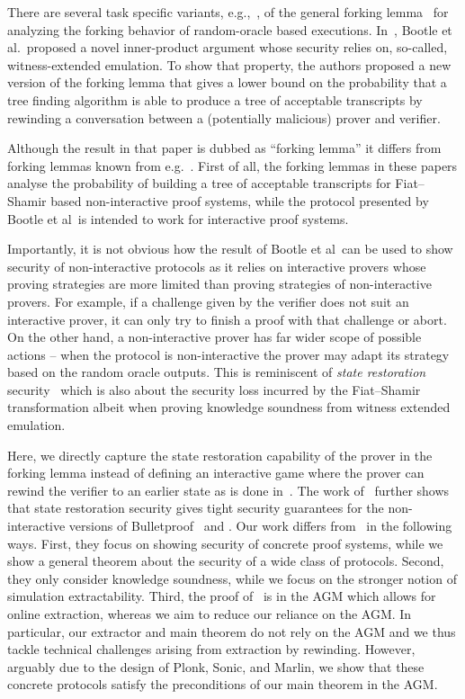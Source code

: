 There are several task specific variants, e.g.,~\cite{INDOCRYPT:HerSae03,CCS:BagCheJar08,AC:BelDaiLi19}, of the general forking lemma~\cite{JC:PoiSte00,CCS:BelNev06} for analyzing the forking behavior of random-oracle based executions.
In~\cite{EC:BCCGP16}, Bootle et al.~proposed a novel inner-product argument whose
security relies on, so-called, witness-extended emulation. To show that
property, the authors proposed a new version of the forking lemma that gives a
lower bound on the probability that a tree finding algorithm is able to produce a
tree of acceptable transcripts by rewinding a conversation between a
(potentially malicious) prover and verifier.

Although the result in that paper is dubbed as ``forking lemma'' it
differs from forking lemmas known from e.g.~\cite{JC:PoiSte00,CCS:BelNev06}.
First of all, the forking lemmas in these papers analyse the probability of building
a tree of acceptable transcripts for Fiat--Shamir based non-interactive proof
systems, while the protocol presented by Bootle et al~is intended to work for
interactive proof systems.

Importantly, it is not obvious how the result of Bootle et al~can be used to
show security of non-interactive protocols as it relies on interactive provers
whose proving strategies are more limited than proving strategies of
non-interactive provers. For example, if a challenge given by the verifier does not
suit an interactive prover, it can only try to finish a proof with that challenge or
abort. On the other hand, a non-interactive prover has far wider scope of
possible actions -- when the protocol is non-interactive the prover may
adapt its strategy based on the random oracle outputs. 
This is reminiscent of \emph{state restoration} security~\cite{TCC:BenChiSpo16,EPRINT:Holmgren19} which is also about the security loss incurred by the Fiat--Shamir transformation albeit when proving knowledge soundness from witness extended emulation.

Here, we directly capture the state restoration capability of the prover in the forking lemma instead of defining an interactive game where the prover can rewind the verifier to an earlier state as is done in~\cite{C:GhoTes21}. 
The work of~\cite{C:GhoTes21} further shows that state restoration security gives tight security guarantees for the
non-interactive versions of Bulletproof~\cite{SP:BBBPWM18} and \sonic. 
Our work differs from~\cite{C:GhoTes21} in the following ways. First, they
focus on showing security of concrete proof systems, while we show
a general theorem about the security of a wide class of protocols. 
Second, they only consider knowledge soundness, while we focus on the stronger notion of simulation extractability. Third, the proof of~\cite{C:GhoTes21} is in the AGM which allows for online extraction, whereas we aim to reduce our reliance on the AGM. In particular, our extractor and main theorem do not rely on the AGM and we thus tackle technical challenges arising from extraction by rewinding.
However, arguably due to the design of Plonk, Sonic, and Marlin, we show that these concrete protocols satisfy the preconditions of our main theorem in the AGM.

